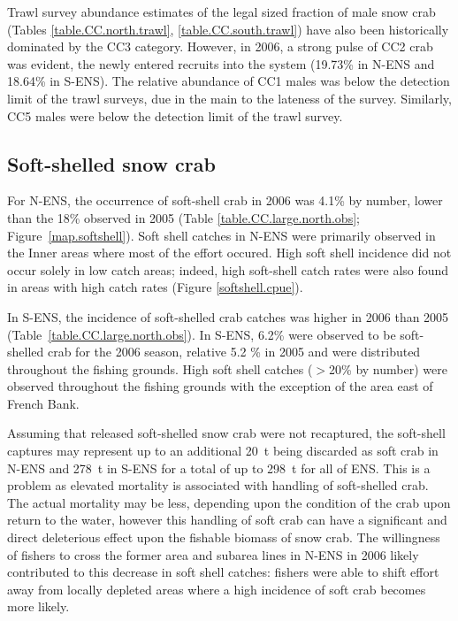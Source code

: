 \documentclass[11pt]{article}
\begin{document}
Trawl survey abundance estimates of the legal sized fraction of male snow crab (Tables \ref{table.CC.north.trawl}, \ref{table.CC.south.trawl}) have also been historically dominated by the CC3 category. However, in 2006, a strong pulse of CC2 crab was evident, the newly entered recruits into the system (19.73\% in N-ENS and 18.64\% in S-ENS). The relative abundance of CC1 males was below the detection limit of the trawl surveys, due in the main to the lateness of the survey. Similarly, CC5 males were below the detection limit of the trawl survey. 


\subsection{Soft-shelled snow crab}

For N-ENS, the occurrence of soft-shell crab in 2006 was 4.1\% by number, lower than the 18\% observed in 2005 (Table \ref{table.CC.large.north.obs}; Figure~\ref{map.softshell}). Soft shell catches in N-ENS were primarily observed in the Inner areas where most of the effort occured. High soft shell incidence did not occur solely in low catch areas; indeed, high soft-shell catch rates were also found in areas with high catch rates (Figure \ref{softshell.cpue}). 

In S-ENS, the incidence of soft-shelled crab catches was higher in 2006 than 2005 (Table~\ref{table.CC.large.north.obs}). In S-ENS, 6.2\% were observed to be soft-shelled crab for the 2006 season, relative 5.2 \% in 2005 and were distributed throughout the fishing grounds. High soft shell catches ($>$20\% by number) were observed throughout the fishing grounds with the exception of the area east of French Bank. 

Assuming that released soft-shelled snow crab were not recaptured, the soft-shell captures may represent up to an additional 20~t being discarded as soft crab in N-ENS and 278~t in S-ENS for a total of up to 298~t for all of ENS. This is a problem as elevated mortality is associated with handling of soft-shelled crab. The actual mortality may be less, depending upon the condition of the crab upon return to the water, however this handling of soft crab can have a significant and direct deleterious effect upon the fishable biomass of snow crab. The willingness of fishers to cross the former area and subarea lines in N-ENS in 2006 likely contributed to this decrease in soft shell catches: fishers were able to shift effort away from locally depleted areas where a high incidence of soft crab becomes more likely.
\end{document}
